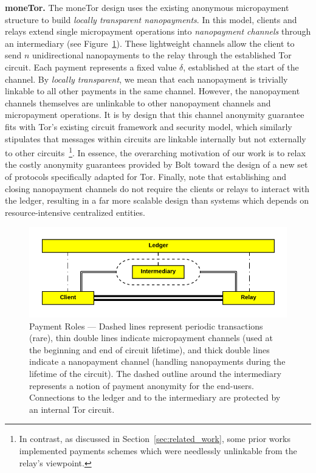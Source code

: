 \medskip \noindent\textbf{moneTor.} The moneTor design uses the existing anonymous micropayment structure to build \emph{locally transparent nanopayments}.
In this model, clients and relays extend single micropayment operations into \emph{nanopayment channels} through an intermediary (see Figure~\ref{fig:parties}).
These lightweight channels allow the client to send $n$ unidirectional nanopayments to the relay through the established Tor circuit.
Each payment represents a fixed value $\delta$, established at the start of the channel.
By \emph{locally transparent}, we mean that each nanopayment is trivially linkable to all other payments in the same channel.
However, the nanopayment channels themselves are unlinkable to other nanopayment channels and micropayment operations.
It is by design that this channel anonymity guarantee fits with Tor's existing circuit framework and security model, which similarly stipulates that messages within circuits are linkable internally but not externally to other circuits~\footnote{In contrast, as discussed in Section~\ref{sec:related_work}, some prior works implemented payments schemes which were needlessly unlinkable from the relay's viewpoint.}.
In essence, the overarching motivation of our work is to relax the costly anonymity guarantees provided by Bolt toward the design of a new set of protocols specifically adapted for Tor.
Finally, note that establishing and closing nanopayment channels do not require the clients or relays to interact with the ledger, resulting in a far more scalable design than systems which depends on resource-intensive centralized entities.

\begin{figure}[h] \centering
  \includegraphics[trim={0.5cm, 0.5cm, 0.5cm, 0.5cm}, clip,
    scale=0.6]{images/party_diagram.pdf}
  \caption[Payment Roles]{Payment Roles --- Dashed lines represent periodic transactions (rare), thin double lines indicate micropayment channels (used at the beginning and end of circuit lifetime), and thick double lines indicate a nanopayment channel (handling nanopayments during the lifetime of the circuit).
    The dashed outline around the intermediary represents a notion of payment anonymity for the end-users.
    Connections to the ledger and to the intermediary are protected by an internal Tor circuit.}
  \label{fig:parties}
\end{figure}

